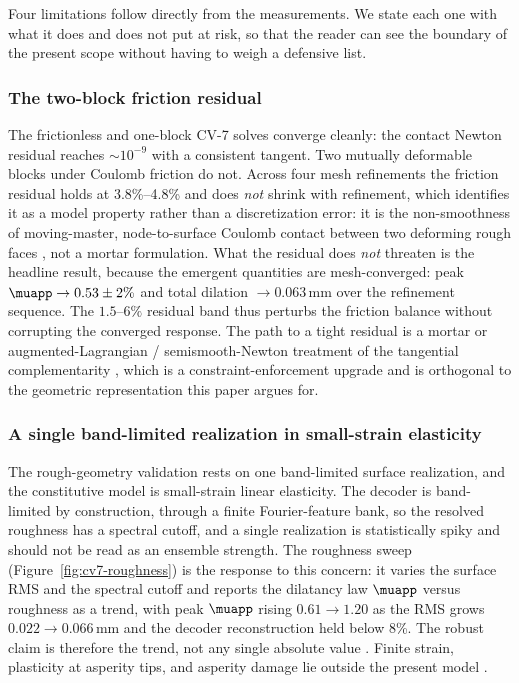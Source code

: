 Four limitations follow directly from the measurements. We state each one with what it does and does not
put at risk, so that the reader can see the boundary of the present scope without having to weigh a
defensive list.

\subsubsection{The two-block friction residual}

The frictionless and one-block CV-7 solves converge cleanly: the contact Newton residual reaches
$\sim 10^{-9}$ with a consistent tangent. Two mutually deformable blocks under Coulomb friction do not.
Across four mesh refinements the friction residual holds at 3.8\%--4.8\% and does \emph{not} shrink with
refinement, which identifies it as a model property rather than a discretization error: it is the
non-smoothness of moving-master, node-to-surface Coulomb contact between two deforming rough faces
\citep{zavarise1998segment,fischer2005frictionless}, not a mortar formulation. What the residual does
\emph{not} threaten is the headline result, because the emergent quantities are mesh-converged: peak
$\muapp \to 0.53\pm 2\%$ and total dilation $\to 0.063$\,mm over the refinement sequence. The
$1.5$--$6\%$ residual band thus perturbs the friction balance without corrupting the converged response.
The path to a tight residual is a mortar or augmented-Lagrangian / semismooth-Newton treatment of the
tangential complementarity \citep{alart1991mixed,simo1992augmented,puso2004mortar,chouly2013nitsche},
which is a constraint-enforcement upgrade and is orthogonal to the geometric representation this paper
argues for.

\subsubsection{A single band-limited realization in small-strain elasticity}

The rough-geometry validation rests on one band-limited surface realization, and the constitutive model
is small-strain linear elasticity. The decoder is band-limited by construction, through a finite
Fourier-feature bank, so the resolved roughness has a spectral cutoff, and a single realization is
statistically spiky and should not be read as an ensemble strength. The roughness sweep
(Figure~\ref{fig:cv7-roughness}) is the response to this concern: it varies the surface RMS and the
spectral cutoff and reports the dilatancy law $\muapp$ versus roughness as a trend, with peak $\muapp$
rising $0.61\to 1.20$ as the RMS grows $0.022\to 0.066$\,mm and the decoder reconstruction held below
8\%. The robust claim is therefore the trend, not any single absolute value
\citep{barton1977shear,barton1990review}. Finite strain, plasticity at asperity tips, and asperity
damage lie outside the present model \citep{ball1977convexity,ciarlet1988mathematical}.

